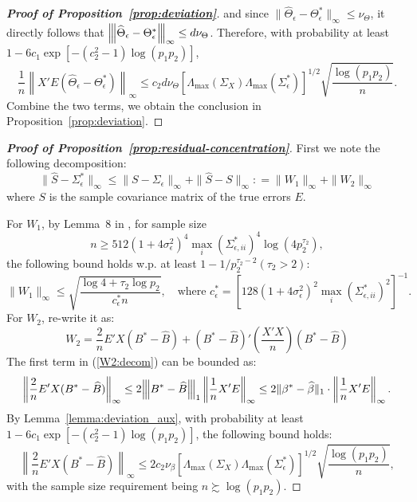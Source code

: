 \begin{proof}[\textbf{Proof of Proposition~\ref{prop:deviation}}]
and since $\|\widehat{\Theta}_\epsilon-\Theta_\epsilon^*\|_\infty\leq \nu_\Theta$, it directly follows that ${\left\vert\kern-0.25ex\left\vert\kern-0.25ex\left\vert \widehat{\Theta}_\epsilon-\Theta_\epsilon^* \right\vert\kern-0.25ex\right\vert\kern-0.25ex\right\vert}_\infty\leq d\nu_\Theta$. Therefore, with probability at least $1-6c_1\exp[-(c_2^2-1)\log (p_1p_2)]$, 
\begin{equation}\label{bound:2nd}
\frac{1}{n}\left\|X'E (\widehat{\Theta}_\epsilon-\Theta_\epsilon^*)\right\|_\infty \leq c_2d\nu_\Theta\left[\Lambda_{\max}(\Sigma_X)\Lambda_{\max}(\Sigma^*_\epsilon)\right]^{1/2} \sqrt{\frac{\log (p_1p_2)}{n}}.
\end{equation}
Combine the two terms, we obtain the conclusion in Proposition~\ref{prop:deviation}.
\end{proof}

%
\medskip
\begin{proof}[\textbf{Proof of Proposition~\ref{prop:residual-concentration}}]
First we note the following decomposition:
\begin{equation*}
\|\widehat{S} - \Sigma^*_\epsilon\|_\infty \leq   \| S - \Sigma_\epsilon \|_\infty + \|\widehat{S} - S \|_\infty : = \|W_1\|_\infty + \|W_2\|_\infty
\end{equation*}
where $S$ is the sample covariance matrix of the true errors $E$. 

For $W_1$, by Lemma~8 in \citet{ravikumar2011high}, for sample size $$n\geq 512(1+4\sigma_\epsilon^2)^4 \max_i(\Sigma^*_{\epsilon,ii})^4\log(4p_2^{\tau_2}),$$ the following bound holds w.p. at least $1-1/p_2^{\tau_2-2}(\tau_2>2)$:
\begin{equation}\label{exp:c_epsilon}
\|W_1\|_\infty \leq \sqrt{\frac{\log 4 + \tau_2 \log p_2}{c^*_\epsilon n}}, \quad \text{where }c_\epsilon^*=\left[ 128(1+4\sigma_\epsilon^2)^2\max\limits_{i}(\Sigma_{\epsilon,ii}^*)^2\right]^{-1}.
\end{equation}
For $W_2$, re-write it as:
\begin{equation}\label{W2:decom}
W_2 = \frac{2}{n} E'X(B^*-\widehat{B}) + (B^*-\widehat{B})'\left(\frac{X'X}{n}\right)  (B^*-\widehat{B}) 
\end{equation}
The first term in (\ref{W2:decom}) can be bounded as:
\begin{equation}\label{W1bound}
\left\|\frac{2}{n} E'X(B^*-\widehat{B})\right\|_\infty \leq 2 {\left\vert\kern-0.25ex\left\vert\kern-0.25ex\left\vert B^*-\widehat{B} \right\vert\kern-0.25ex\right\vert\kern-0.25ex\right\vert}_1\left\|\frac{1}{n}X'E\right\|_\infty \leq 2\|\beta^*-\widehat{\beta}\|_1\cdot \left\|\frac{1}{n}X'E\right\|_\infty.
\end{equation}
By Lemma~\ref{lemma:deviation_aux},  with probability at least $1-6c_1\exp[-(c_2^2-1)\log (p_1p_2)]$, the following bound holds:
\begin{equation}\label{W2bound:1st}
\left\|\frac{2}{n} E'X(B^*-\widehat{B})\right\|_\infty \leq 2c_2\nu_\beta \left[\Lambda_{\max}(\Sigma_X)\Lambda_{\max}(\Sigma^*_\epsilon)\right]^{1/2} \sqrt{\frac{\log (p_1p_2) }{n}},
\end{equation}
with the sample size requirement being $n\succsim \log(p_1p_2)$. 


\end{proof}
